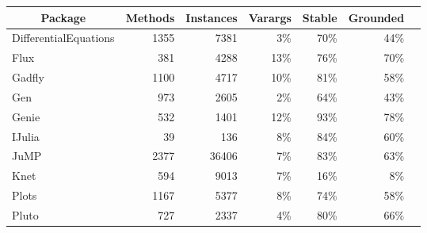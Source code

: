 \begin{tabular}{@{}lrrrrrr@{}}
\toprule
\multicolumn{1}{c}{Package} & \multicolumn{1}{c}{Methods} & \multicolumn{1}{c}{Instances} & \multicolumn{1}{c}{Varargs} & \multicolumn{1}{c}{Stable} & \multicolumn{1}{c}{Grounded} \\ \midrule
{\footnotesize DifferentialEquations}       & 1355                        & 7381                          & 3\%                         & 70\%                       & 44\%                         \\
Flux                        & 381                         & 4288                          & 13\%                        & 76\%                       & 70\%                         \\
Gadfly                      & 1100                        & 4717                          & 10\%                         & 81\%                       & 58\%                         \\
Gen                         & 973                         & 2605                          & 2\%                         & 64\%                       & 43\%                         \\
Genie                       & 532                         & 1401                          & 12\%                        & 93\%                       & 78\%                         \\
IJulia                      & 39                          & 136                           & 8\%                         & 84\%                       & 60\%                         \\
JuMP                        & 2377                        & 36406                         & 7\%                        & 83\%                       & 63\%                         \\
Knet                        & 594                         & 9013                          & 7\%                         & 16\%                       & 8\%                          \\
Plots                       & 1167                        & 5377                          & 8\%                         & 74\%                       & 58\%                         \\
Pluto                       & 727                         & 2337                          & 4\%                         & 80\%                       & 66\%                         \\ \bottomrule
\end{tabular}

